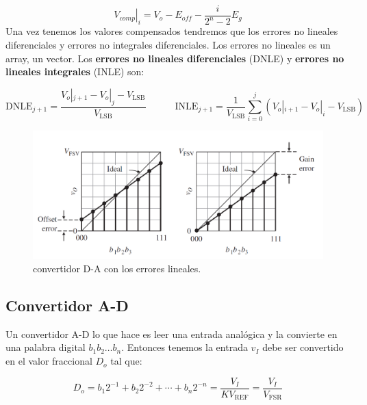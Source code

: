 \documentclass[11pt]{article} %
\newcommand{\parentesis}[1]{\left( #1  \right)}
\newcommand{\tquad}{\quad \quad \quad}
\newcommand{\REF}{\mathrm{REF}}
\newcommand{\FSR}{\mathrm{FSR}}
\newcommand{\LSB}{\mathrm{LSB}}
\newcommand{\DNLE}{\mathrm{DNLE}}
\newcommand{\INLE}{\mathrm{INLE}}
\begin{document}
\begin{equation}
\left. V_{comp}  \right|_i = V_o - E_{off} - \dfrac{i}{2^n - 2} E_g
\end{equation}
Una vez tenemos los valores compensados tendremos que los errores no lineales diferenciales y errores no integrales diferenciales.  Los errores no lineales es un array, un vector. Los \textbf{errores no lineales diferenciales} (DNLE) y \textbf{errores no lineales integrales} (INLE) son:

\begin{equation}
\DNLE_{j+1} = \dfrac{V_o|_{j+1} - V_o|_{j} - V_\LSB}{V_\LSB} \tquad 
\INLE_{j+1} = \dfrac{1}{V_\LSB} \sum_{i=0}^j \parentesis{ V_o|_{i+1} - V_o|_{i} - V_\LSB}
\end{equation}

\begin{figure}[h!] \centering
\includegraphics[scale=0.6]{3.1-Errores.png}
\caption{convertidor D-A con los errores lineales.}
\label{Fig:3.02}
\end{figure} 

\subsection{Convertidor A-D}

Un convertidor A-D lo que hace es leer una entrada analógica y la convierte en una palabra digital $b_1 b_2 \ldots b_n$. Entonces tenemos la entrada $v_I$ debe ser convertido en el valor fraccional $D_o$ tal que:

\begin{equation}
D_o = b_1 2^{-1} + b_2 2^{-2} + \cdots + b_n 2^{-n} = \dfrac{V_I}{K  V_\REF} = \dfrac{V_I}{V_\FSR} 
\end{equation}


 
 
\end{document}
